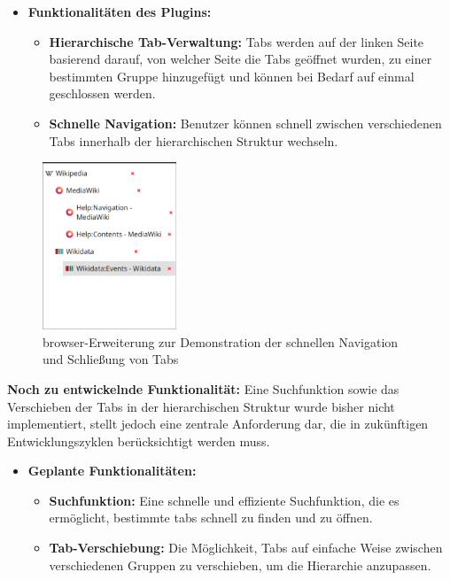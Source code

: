 \begin{itemize}
    \item \textbf{Funktionalitäten des Plugins:}
    \begin{itemize}
        \item \textbf{Hierarchische Tab-Verwaltung:} Tabs werden auf der linken Seite basierend darauf, von welcher Seite die Tabs geöffnet wurden, zu einer bestimmten Gruppe hinzugefügt und können bei Bedarf auf einmal geschlossen werden.
        \item \textbf{Schnelle Navigation:} Benutzer können schnell zwischen verschiedenen Tabs innerhalb der hierarchischen Struktur wechseln.
    \end{itemize}
\end{itemize}

\begin{figure}[H]
    \caption{\gls{browser}-Erweiterung zur Demonstration der schnellen Navigation und Schließung von Tabs}
    \includegraphics[height=5cm]{abbildungen/hirachie.png}
\end{figure}

\textbf{Noch zu entwickelnde Funktionalität:}
Eine Suchfunktion sowie das Verschieben der Tabs in der hierarchischen Struktur wurde bisher nicht implementiert, stellt jedoch eine zentrale Anforderung dar, die in zukünftigen Entwicklungszyklen berücksichtigt werden muss.

\begin{itemize}
    \item \textbf{Geplante Funktionalitäten:}
    \begin{itemize}
        \item \textbf{Suchfunktion:} Eine schnelle und effiziente Suchfunktion, die es ermöglicht, bestimmte \gls{tab}s schnell zu finden und zu öffnen.
        \item \textbf{Tab-Verschiebung:} Die Möglichkeit, Tabs auf einfache Weise zwischen verschiedenen Gruppen zu verschieben, um die Hierarchie anzupassen.
    \end{itemize}
\end{itemize}

